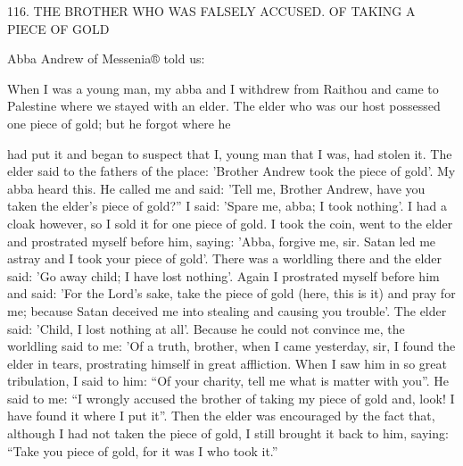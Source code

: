 116.
THE BROTHER WHO WAS FALSELY ACCUSED.
OF TAKING A PIECE OF GOLD

Abba Andrew of Messenia® told us:

When I was a young man, my abba and I withdrew from Raithou
and came to Palestine where we stayed with an elder.
The elder who
was our host possessed one piece of gold; but he forgot where he

had put it and began to suspect that I, young man that I was, had
stolen it.
The elder said to the fathers of the place: 'Brother Andrew
took the piece of gold'.
My abba heard this.
He called me and said:
'Tell me, Brother Andrew, have you taken the elder's piece of gold?”
I said: 'Spare me, abba; I took nothing'.
I had a cloak however, so
I sold it for one piece of gold.
I took the coin, went to the elder and
prostrated myself before him, saying: 'Abba, forgive me, sir.
Satan
led me astray and I took your piece of gold'.
There was a worldling
there and the elder said: 'Go away child; I have lost nothing'.
Again
I prostrated myself before him and said: 'For the Lord's sake, take
the piece of gold (here, this is it) and pray for me; because Satan
deceived me into stealing and causing you trouble'.
The elder said:
'Child, I lost nothing at all'.
Because he could not convince me, the
worldling said to me: 'Of a truth, brother, when I came yesterday,
sir, I found the elder in tears, prostrating himself in great affliction.
When I saw him in so great tribulation, I said to him: “Of your
charity, tell me what is matter with you”.
He said to me: “I wrongly
accused the brother of taking my piece of gold and, look! I have
found it where I put it”.
Then the elder was encouraged by the fact
that, although I had not taken the piece of gold, I still brought it
back to him, saying: “Take you piece of gold, for it was I who took
it.”

